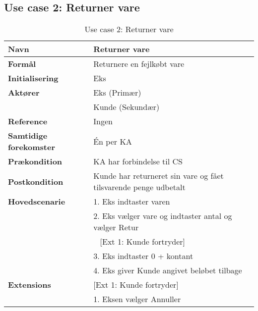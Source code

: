 \subsection{Use case 2: Returner vare}


\begin{table}[H]
\begin{tabularx}{\textwidth}{|l|X|}
\hline
\textbf{Navn}					& Returner vare \\\hline
\textbf{Formål}					& Returnere en fejlkøbt vare \\\hline
\textbf{Initialisering}			& \gls{Eks} \\\hline
\textbf{Aktører}				& \gls{Eks} (Primær) \\
								& \gls{Kunde} (Sekundær) \\\hline
\textbf{Reference}				& Ingen \\\hline
								
\textbf{Samtidige forekomster}	& Én per \gls{KA} \\\hline
\textbf{Prækondition}			& \gls{KA} har forbindelse til \gls{CS} \\\hline
\textbf{Postkondition}			& \gls{Kunde} har returneret sin vare og fået tilsvarende penge udbetalt \\\hline
\textbf{Hovedscenarie}			
& 1. \gls{Eks} indtaster varen \\			
& 2. \gls{Eks} vælger vare og indtaster antal og vælger Retur \\
& ~ [Ext 1: \gls{Kunde} fortryder] \\
& 3. \gls{Eks} indtaster 0 + kontant \\
& 4. \gls{Eks} giver \gls{Kunde} angivet beløbet tilbage \\\hline

\textbf{Extensions}				
& [Ext 1: \gls{Kunde} fortryder] \\
& 1. \gls{Eks}en vælger Annuller \\\hline
\end{tabularx}
\caption{Use case 2: Returner vare}
\label{tab:UCrtv}
\end{table}